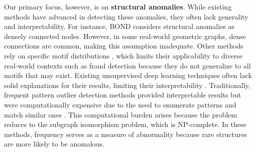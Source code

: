 \documentclass[pdflatex,sn-mathphys-num]{sn-jnl}%
\theoremstyle{thmstyleone}%
\theoremstyle{thmstyletwo}%
\theoremstyle{thmstylethree}%
\begin{document}
Our primary focus, however, is on \textbf{structural anomalies}. While existing methods have advanced in detecting these anomalies, they often lack generality and interpretability. For instance, BOND \cite{NEURIPS2022-acc1ec4a} considers structural anomalies as densely connected nodes. However, in some real-world geometric graphs, dense connections are common, making this assumption inadequate. Other methods rely on specific motif distributions \cite{bandyopadhyay2020outlier,xu2022contrastive,yuan2024higherorder}, which limits their applicability to diverse real-world contexts such as fraud detection because they do not generalize to all motifs that may exist. Existing unsupervised deep learning techniques often lack solid explanations for their results, limiting their interpretability \cite{angelov2021explainable}. Traditionally, frequent pattern outlier detection methods provided interpretable results but were computationally expensive due to the need to enumerate patterns and match similar ones \cite{bressan2021faster,he2004frequent,yan2002gspan}. This computational burden arises because the problem reduces to the subgraph isomorphism problem, which is NP-complete. In these methods, frequency serves as a measure of abnormality because rare structures are more likely to be anomalous.
\end{document}
